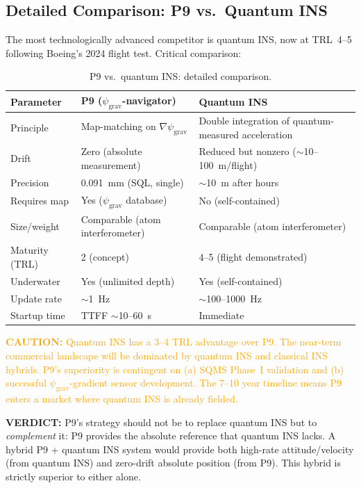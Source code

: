 \documentclass[11pt]{article}
\theoremstyle{definition}
\theoremstyle{remark}
\newcommand{\psigrav}{\psi_{\mathrm{grav}}}
\newcommand{\caution}[1]{\textcolor{orange}{\textbf{CAUTION:} #1}}
\newcommand{\verdict}[1]{\textcolor{green!50!black}{\textbf{VERDICT:} #1}}
\begin{document}
\subsection{Detailed Comparison: P9 vs.\ Quantum INS}

The most technologically advanced competitor is quantum INS, now at TRL~4--5
following Boeing's 2024 flight test. Critical comparison:

\begin{table}[H]
\centering
\caption{P9 vs.\ quantum INS: detailed comparison.}
\label{tab:p9-vs-qins}
\begin{tabular}{@{}p{3.5cm}p{4.5cm}p{4.5cm}@{}}
\toprule
Parameter & P9 ($\psigrav$-navigator) & Quantum INS \\
\midrule
Principle & Map-matching on $\nabla\psigrav$ & Double integration of quantum-measured acceleration \\
Drift & Zero (absolute measurement) & Reduced but nonzero ($\sim$10--100~m/flight) \\
Precision & 0.091~mm (SQL, single) & $\sim$10~m after hours \\
Requires map & Yes ($\psigrav$ database) & No (self-contained) \\
Size/weight & Comparable (atom interferometer) & Comparable (atom interferometer) \\
Maturity (TRL) & 2 (concept) & 4--5 (flight demonstrated) \\
Underwater & Yes (unlimited depth) & Yes (self-contained) \\
Update rate & $\sim$1~Hz & $\sim$100--1000~Hz \\
Startup time & TTFF $\sim$10--60~s & Immediate \\
\bottomrule
\end{tabular}
\end{table}

\caution{Quantum INS has a 3--4 TRL advantage over P9. The near-term commercial
landscape will be dominated by quantum INS and classical INS hybrids. P9's
superiority is contingent on (a) SQMS Phase~I validation and (b) successful
$\psigrav$-gradient sensor development. The 7--10 year timeline means P9
enters a market where quantum INS is already fielded.}

\verdict{P9's strategy should not be to replace quantum INS but to
\emph{complement} it: P9 provides the absolute reference that quantum INS
lacks. A hybrid P9 + quantum INS system would provide both high-rate
attitude/velocity (from quantum INS) and zero-drift absolute position
(from P9). This hybrid is strictly superior to either alone.}
\end{document}

